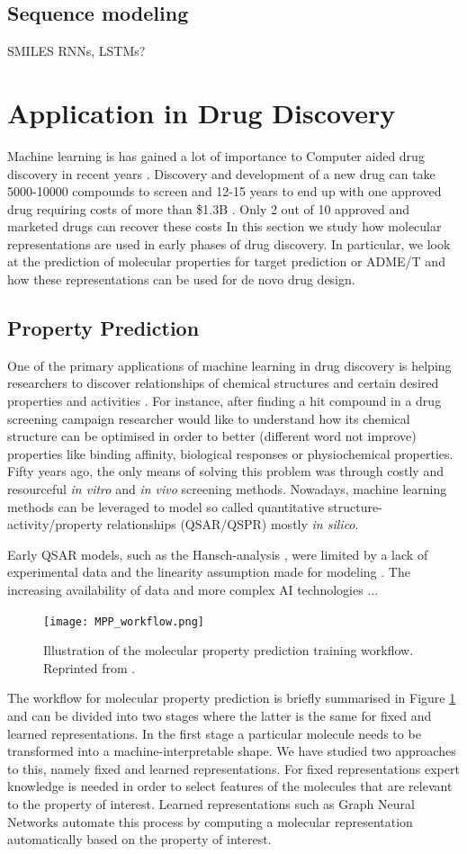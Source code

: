 \subsection{Sequence modeling}
SMILES RNNs, LSTMs? \cite{honda}
\section{Application in Drug Discovery}
Machine learning is has gained a lot of importance to Computer aided drug discovery in recent years \citep{ML_chem}. Discovery and development of a new drug can take 5000-10000 compounds to screen and 12-15 years to end up with one approved drug requiring costs of more than \$1.3B . Only 2 out of 10 approved and marketed drugs can recover these costs \cite{hecht}
In this section we study how molecular representations are used in early phases of drug discovery. In particular, we look at the prediction of molecular properties for target prediction or ADME/T and how these representations can be used for de novo drug design.
\subsection{Property Prediction}
One of the primary applications of machine learning in drug discovery is helping researchers to discover relationships of chemical structures and certain desired properties and activities \citep{LO20181538}. For instance, after finding a hit compound in a drug screening campaign researcher would like to understand how its chemical structure can be optimised in order to better (different word not  improve) properties like binding affinity, biological responses or physiochemical properties. Fifty years ago, the only means of solving this problem was through costly and resourceful \emph{in vitro} and \emph{in vivo} screening methods. Nowadays, machine learning methods can be leveraged to model so called quantitative structure-activity/property relationships (QSAR/QSPR) mostly \emph{in silico}. 

Early QSAR models, such as the Hansch-analysis \citep{hansch}, were limited by a lack of experimental data and the linearity assumption made for modeling \citep{LO20181538}. The increasing availability of data and more complex AI technologies ...
\begin{figure}[h]
	\centering 
	\texttt{[image: MPP\_workflow.png]}
	\caption{Illustration of the molecular property prediction training workflow. Reprinted from \cite{yangMPP}. }
	\label{fig:mpp_workflow}
\end{figure}
The workflow for molecular property prediction is briefly summarised in Figure \ref{fig:mpp_workflow} and can be divided into two stages where the latter is the same for fixed and learned representations. In the first stage a particular molecule needs to be transformed into a machine-interpretable shape. We have studied two approaches to this, namely fixed and learned representations. For fixed representations expert knowledge is needed in order to select features of the molecules that are relevant to the property of interest. Learned representations such as Graph Neural Networks automate this process by computing a molecular representation automatically based on the property of interest. 

